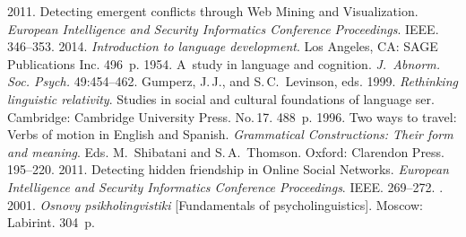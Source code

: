   \begin{multicols}{2}

\renewcommand{\bibname}{\protect\rmfamily References}

{\small\frenchspacing
 {%
 \begin{thebibliography}{99}
 2011. Detecting emergent conflicts through Web Mining 
and Visualization. \textit{European Intelligence and Security Informatics Conference 
 Proceedings}. IEEE. 346--353.
 2014. \textit{Introduction to language development}. Los 
Angeles, CA: SAGE Publications Inc. 496~p.
 1954. A~study in language and cognition. 
\textit{J.~Abnorm. Soc. Psych.} 49:454--462.
Gumperz, J.\,J., and S.\,C.~Levinson, eds. 1999.
\textit{Rethinking linguistic relativity}.  Studies in social and cultural foundations of 
language ser. Cambridge: Cambridge University Press. No.\,17. 488~p.
 1996. Two ways to travel: Verbs of motion in English and Spanish. 
\textit{Grammatical Constructions: Their form and meaning}. Eds. M.~Shibatani and 
S.\,A.~Thomson. Oxford: Clarendon Press. 195--220.
 2011. Detecting hidden friendship in Online Social Networks. 
\textit{European Intelligence and Security Informatics Conference 
Proceedings}. IEEE. 269--272.
. 2001. \textit{Osnovy psi\-kho\-ling\-vi\-sti\-ki} 
[Fundamentals of psycholinguistics]. Moscow: Labirint. 304~p.



\end{thebibliography}}}
\end{multicols}
